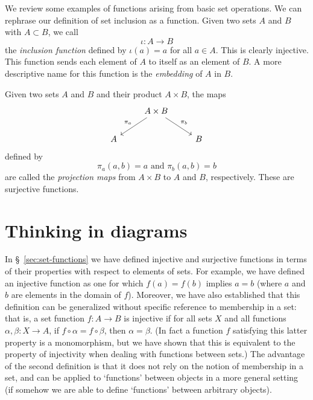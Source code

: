 \begin{sectionthm}
    We review some examples of functions arising from basic set operations. We
    can rephrase our definition of set inclusion as a function. Given two sets
    \(A\) and \(B\) with \(A \subset B\), we call
    \[
        \iota: A \to B
    \]
    the \emph{inclusion function} defined by \(\iota(a) = a\) for all \(a \in
    A\). This is clearly injective. This function sends each element of \(A\) to
    itself as an element of \(B\). A more descriptive name for this function is
    the \emph{embedding} of \(A\) in \(B\).

    Given two sets \(A\) and \(B\) and their product \(A \times B\), the maps
    \[
        \begin{tikzcd}
            & A\times B \arrow[ld, "\pi_a"'] \arrow[rd, "\pi_b"] &   \\
          A &                                                    & B
          \end{tikzcd}
    \]
    defined by
    \[
        \pi_a(a, b) = a \text{ and } \pi_b(a, b) = b
    \]
    are called the \emph{projection maps} from \(A \times B\) to \(A\) and
    \(B\), respectively. These are surjective functions.
\end{sectionthm}


\section{Thinking in diagrams}
\label{sec:category-theory}

In \S~\ref{sec:set-functions} we have defined injective and surjective functions
in terms of their properties with respect to elements of sets. For example, we
have defined an injective function as one for which \(f(a) = f(b)\) implies \(a
= b\) (where \(a\) and \(b\) are elements in the domain of \(f\)). Moreover, we
have also established that this definition can be generalized without specific
reference to membership in a set: that is, a set function \(f: A \to B\) is
injective if for all sets \(X\) and all functions \(\alpha, \beta: X \to A\), if
\(f \circ \alpha = f \circ \beta\), then \(\alpha = \beta\). (In fact a function
\(f\) satisfying this latter property is a monomorphism, but we have shown that
this is equivalent to the property of injectivity when dealing with functions
between sets.) The advantage of the second definition is that it does not rely
on the notion of membership in a set, and can be applied to `functions' between
objects in a more general setting (if somehow we are able to define `functions'
between arbitrary objects).

